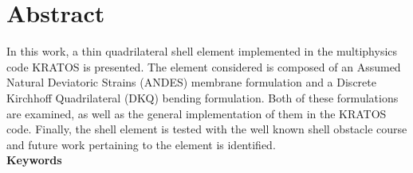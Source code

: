 
\chapter*{Abstract}
\label{cha:abstract}

In this work, a thin quadrilateral shell element implemented in the multiphysics code KRATOS is presented. The element considered is composed of an Assumed Natural Deviatoric Strains (ANDES) membrane formulation and a Discrete Kirchhoff Quadrilateral (DKQ) bending formulation. Both of these formulations are examined, as well as the general implementation of them in the KRATOS code. Finally, the shell element is tested with the well known shell obstacle course and future work pertaining to the element is identified.\\


{\textcolor{gray75}{\Huge\bfseries{Keywords}}}

\keywords